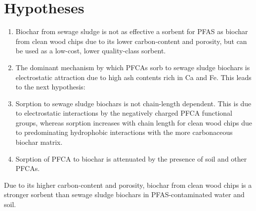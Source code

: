 \section{Hypotheses \label{sec:hypothesis}}
\begin{enumerate}[label=\roman*]
    \item Biochar from sewage sludge is not as effective a sorbent for PFAS as biochar from clean wood chips due to its lower carbon-content and porosity, but can be used as a low-cost, lower quality-class sorbent.
    \item The dominant mechanism by which PFCAs sorb to sewage sludge biochars is electrostatic attraction due to high ash contents rich in Ca and Fe. This leads to the next hypothesis: 
    \item Sorption to sewage sludge biochars is not chain-length dependent. This is due to electrostatic interactions by the negatively charged PFCA functional groups, whereas sorption increases with chain length for clean wood chips due to predominating hydrophobic interactions with the more carbonaceous biochar matrix.
    \item Sorption of PFCA to biochar is attenuated by the presence of soil and other PFCAs. 
\end{enumerate}


Due to its higher carbon-content and porosity, biochar from clean wood chips is a stronger sorbent than sewage sludge biochars in PFAS-contaminated water and soil. 



